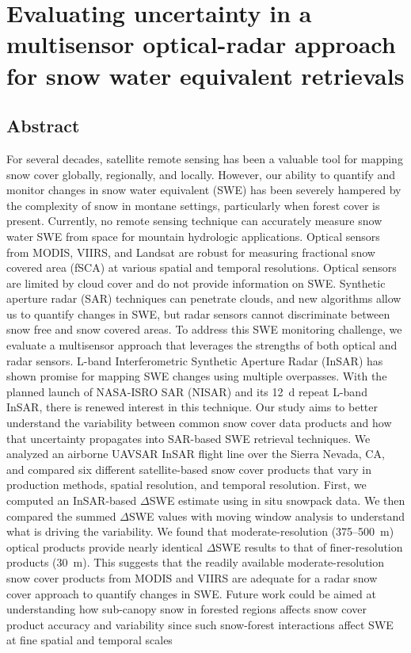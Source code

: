 \hypertarget{ch4}{%
\chapter{Evaluating uncertainty in a multisensor optical-radar approach for snow water equivalent retrievals}\label{ch4}}


\hypertarget{ch4-abstract}{\section{Abstract}\label{ch4-abstract}}
For several decades, satellite remote sensing has been a valuable tool for mapping snow cover globally, regionally, and locally. However, our ability to quantify and monitor changes in snow water equivalent (SWE) has been severely hampered by the complexity of snow in montane settings, particularly when forest cover is present. Currently, no remote sensing technique can accurately measure snow water SWE from space for mountain hydrologic applications. Optical sensors from MODIS, VIIRS, and Landsat are robust for measuring fractional snow covered area (fSCA) at various spatial and temporal resolutions. Optical sensors are limited by cloud cover and do not provide information on SWE. Synthetic aperture radar (SAR) techniques can penetrate clouds, and new algorithms allow us to quantify changes in SWE, but radar sensors cannot discriminate between snow free and snow covered areas. To address this SWE monitoring challenge, we evaluate a multisensor approach that leverages the strengths of both optical and radar sensors. L-band Interferometric Synthetic Aperture Radar (InSAR) has shown promise for mapping SWE changes using multiple overpasses. With the planned launch of NASA-ISRO SAR (NISAR) and its 12~d repeat L-band InSAR, there is renewed interest in this technique. Our study aims to better understand the variability between common snow cover data products and how that uncertainty propagates into SAR-based SWE retrieval techniques. We analyzed an airborne UAVSAR InSAR flight line over the Sierra Nevada, CA, and compared six different satellite-based snow cover products that vary in production methods, spatial resolution, and temporal resolution. First, we computed an InSAR-based $\Delta$SWE estimate using in situ snowpack data. We then compared the summed $\Delta$SWE values with moving window analysis to understand what is driving the variability. We found that moderate-resolution (375--500~m) optical products provide nearly identical $\Delta$SWE results to that of finer-resolution products (30~m). This suggests that the readily available moderate-resolution snow cover products from MODIS and VIIRS are adequate for a radar snow cover approach to quantify changes in SWE. Future work could be aimed at understanding how sub-canopy snow in forested regions affects snow cover product accuracy and variability since such snow-forest interactions affect SWE at fine spatial and temporal scales 
